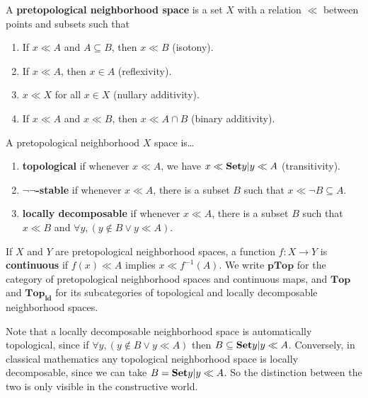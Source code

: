 \documentclass{article}
\def\cpl#1{\neg #1}
\def\inv{^{-1}}
\def\nn{\ensuremath{\neg\neg}}
\def\PTop{\mathbf{pTop}}
\def\Top{\mathbf{Top}}
\def\PTopnn{\mathbf{pTop}_{\nn}}
\def\ldTop{\mathbf{Top}_{\mathbf{ld}}}
\begin{document}
\begin{defn}
  A \textbf{pretopological neighborhood space} is a set $X$ with a relation $\ll$ between points and subsets such that
  \begin{enumerate}
  \item If $x\ll A$ and $A\subseteq B$, then $x\ll B$ (isotony).
  \item If $x\ll A$, then $x\in A$ (reflexivity).
  \item $x\ll X$ for all $x\in X$ (nullary additivity).
  \item If $x\ll A$ and $x\ll B$, then $x\ll A\cap B$ (binary additivity).
  \end{enumerate}
  A pretopological neighborhood $X$ space is\dots
  \begin{enumerate}[resume]
  \item \textbf{topological} if whenever $x\ll A$, we have $x \ll \setof{ y | y\ll A}$ (transitivity).
  \item \textbf{\nn-stable} if whenever $x\ll A$, there is a subset $B$ such that $x\ll \cpl{B} \subseteq A$.
  \item \textbf{locally decomposable} if whenever $x\ll A$, there is a subset $B$ such that $x\ll B$ and $\forall y, (y\notin B \lor y \ll A)$.
  \end{enumerate}
  If $X$ and $Y$ are pretopological neighborhood spaces, a function $f:X\to Y$ is \textbf{continuous} if $f(x)\ll A$ implies $x\ll f\inv(A)$.
  We write $\PTop$ for the category of pretopological neighborhood spaces and continuous maps, and $\Top$
  and $\ldTop$ for its subcategories of topological %
  and locally decomposable neighborhood spaces.
\end{defn}

Note that a locally decomposable neighborhood space is automatically topological, %
since if $\forall y, (y\notin B \lor y \ll A)$ then %
$B \subseteq \setof{ y | y\ll A}$.
Conversely, in classical mathematics any topological neighborhood space is locally decomposable, since we can take $B = \setof{ y | y\ll A}$.
So the distinction between the two is only visible in the constructive world.
\end{document}
